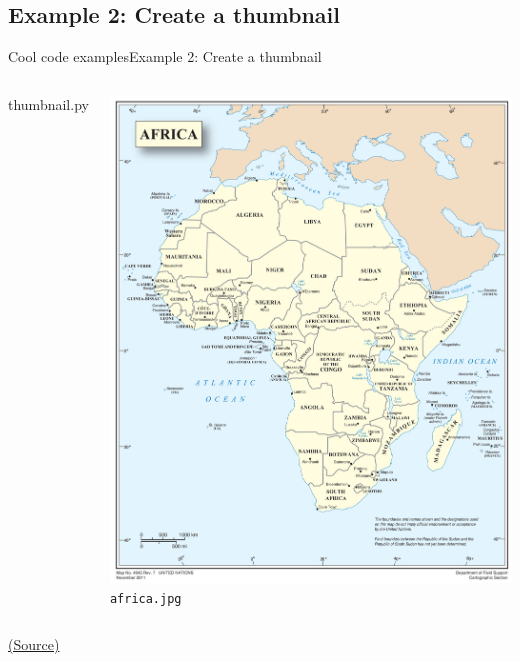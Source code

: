 \documentclass[10pt,compress]{beamer} %
\begin{document}
\subsection{Example 2: Create a thumbnail}
\begin{frame}[plain]{Cool code examples}{Example 2: Create a thumbnail}
	\begin{columns}

		\vspace{-0.2cm}
		\begin{block}{thumbnail.py}
		\vspace{-0.2cm}
		
		\vspace{-0.2cm}
		\end{block}

		

		\vspace{-0.2cm}
		\centering \includegraphics[width=\linewidth]{figs/africa.jpg}\\
	 	\texttt{africa.jpg}
	\end{columns}
		\vspace{-0.2cm}
	\centering \tiny{\href{http://www.pythonforbeginners.com/gui/how-to-use-pillow}{(Source)}}
\end{frame}
\end{document}
